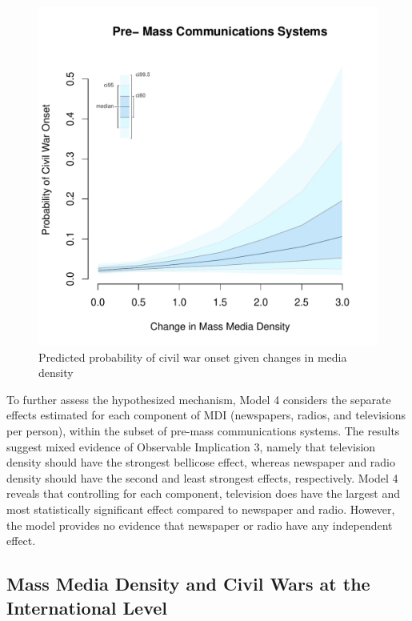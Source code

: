 \documentclass[11pt,article,oneside]{memoir}
\makeatletter
\def\maxwidth{\ifdim\Gin@nat@width>\linewidth\linewidth
\else\Gin@nat@width\fi}
\let\Oldincludegraphics\includegraphics
\renewcommand{\includegraphics}[1]{\Oldincludegraphics[width=\maxwidth]{#1}}
\makeatother
\begin{document}
\clearpage

\begin{figure} 
\includegraphics{figure/d_mdi_effect.pdf} 
\caption{Predicted probability of civil war onset given changes in media density} 
\label{myFigz} 
\end{figure}

To further assess the hypothesized mechanism, Model 4 considers the
separate effects estimated for each component of MDI (newspapers,
radios, and televisions per person), within the subset of pre-mass
communications systems. The results suggest mixed evidence of Observable
Implication 3, namely that television density should have the strongest
bellicose effect, whereas newspaper and radio density should have the
second and least strongest effects, respectively. Model 4 reveals that
controlling for each component, television does have the largest and
most statistically significant effect compared to newspaper and radio.
However, the model provides no evidence that newspaper or radio have any
independent effect.

\subsection{Mass Media Density and Civil Wars at the International
Level}\label{mass-media-density-and-civil-wars-at-the-international-level}
\end{document}

